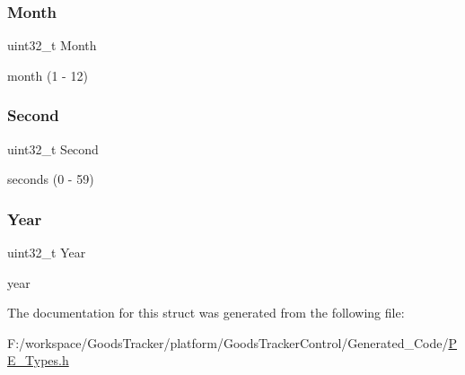 \subsubsection{\texorpdfstring{Month}{Month}}
{\footnotesize\ttfamily uint32\+\_\+t Month}

month (1 -\/ 12) \mbox{\label{struct_l_d_d___r_t_c___t_time_adda45a5c5f4c35da36abaf4da7f3e076}} 
\subsubsection{\texorpdfstring{Second}{Second}}
{\footnotesize\ttfamily uint32\+\_\+t Second}

seconds (0 -\/ 59) \mbox{\label{struct_l_d_d___r_t_c___t_time_a005ca34a2aa55d22797b99e02244d852}} 
\subsubsection{\texorpdfstring{Year}{Year}}
{\footnotesize\ttfamily uint32\+\_\+t Year}

year 

The documentation for this struct was generated from the following file\+:\begin{DoxyCompactItemize}
\item 
F\+:/workspace/\+Goods\+Tracker/platform/\+Goods\+Tracker\+Control/\+Generated\+\_\+\+Code/\hyperlink{_p_e___types_8h}{P\+E\+\_\+\+Types.\+h}\end{DoxyCompactItemize}
